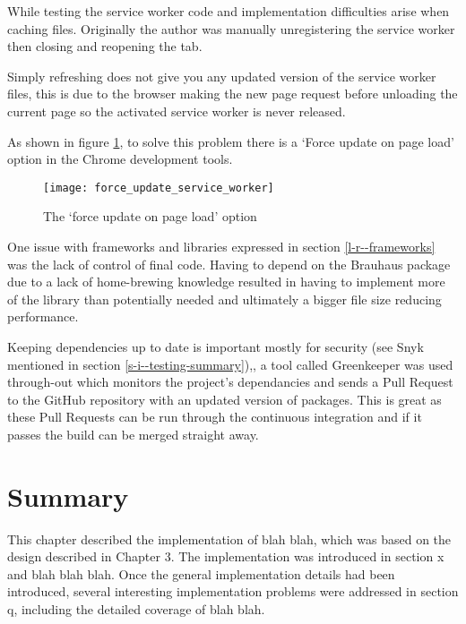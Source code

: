 
While testing the service worker code and implementation difficulties arise when caching files. Originally the author was manually unregistering the service worker then closing and reopening the tab.

Simply refreshing does not give you any updated version of the service worker files, this is due to the browser making the new page request before unloading the current page so the activated service worker is never released. \cite{refresh_sw}

As shown in figure \ref{figure-force-update-service-worker}, to solve this problem there is a `Force update on page load' option in the Chrome development tools.

\begin{figure}[H]
  \centering
    \texttt{[image: force\_update\_service\_worker]}
  \caption{The `force update on page load' option}
  \label{figure-force-update-service-worker}
\end{figure}

One issue with frameworks and libraries expressed in section \ref{l-r--frameworks} was the lack of control of final code. Having to depend on the Brauhaus package due to a lack of home-brewing knowledge resulted in having to implement more of the library than potentially needed and ultimately a bigger file size reducing performance.

Keeping dependencies up to date is important mostly for security (see Snyk mentioned in section \ref{s-i--testing-summary}),, a tool called Greenkeeper was used through-out which monitors the project's dependancies and sends a Pull Request to the GitHub repository with an updated version of packages. This is great as these Pull Requests can be run through the continuous integration and if it passes the build can be merged straight away.  %

\section{Summary} \label{s-i--summary}

This chapter described the implementation of blah blah, which was based on the design described in Chapter 3. The implementation was introduced in section x and blah blah blah. Once the general implementation details had been introduced, several interesting implementation problems were addressed in section q, including the detailed coverage of blah blah.

